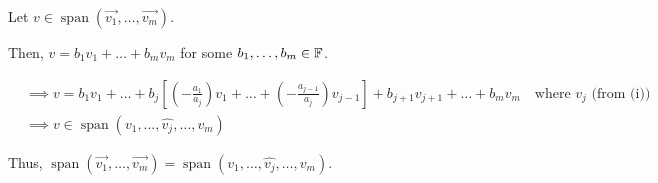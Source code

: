 {{\begin{enumerate}[label=(\roman*)]
			      Let \(v \in \operatorname{span}\left( \vec{v_1}, \ldots, \vec{v_m} \right) \).

			      Then, \(v = b_1 v_1 + \ldots + b_{m} v_{m}\) for some \(b_1, \ldots, b_{m} \in \FF\).

			      \begin{align*}
				       & \implies v = b_1 v_1 + \ldots + b_{j}\left[ \left(-\frac{a_1}{a_{j}}\right)v_1 + \ldots + \left(-\frac{a_{j-1}}{a_{j}}\right)v_{j-1} \right] + b_{j+1} v_{j+1} + \ldots + b_{m} v_{m} \quad\text{where \(v_{j}\) (from (i))} \\
				       & \implies v \in \operatorname{span}\left( v_1, \ldots, \hat{v_{j}}, \ldots, v_{m} \right)
			      \end{align*}

			      Thus, \(\operatorname{span}\left( \vec{v_1}, \ldots, \vec{v_m}  \right) = \operatorname{span}\left( v_1, \ldots, \hat{v_{j}}, \ldots, v_{m} \right) \).
		\end{enumerate}
	}

}

